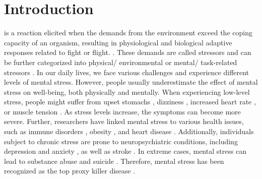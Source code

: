 \documentclass[journal]{IEEEtran}
\begin{document}
\section{Introduction}
 is a reaction elicited when the demands from the environment exceed the coping capacity of an organism, resulting in physiological and biological adaptive responses related to fight or flight. \cite{cohen1997stress_def}.
These demands are called stressors and can be further categorized into physical/ environmental or mental/ task-related stressors \cite{giannakakis2019stress_review_physiological_change}.
In our daily lives, we face various challenges and experience different levels of mental stress.
However, people usually underestimate the effect of mental stress on well-being, both physically and mentally.
When experiencing low-level stress, people might suffer from upset stomachs \cite{behere2011stress_upset_stomach}, dizziness \cite{andersson2000stess_dizzy}, increased heart rate \cite{delaney2000stress_hr}, or muscle tension \cite{lundberg1999stress_muscle}.
As stress levels increase, the symptoms can become more severe.
Further,  researchers have linked mental stress to various health issues, such as immune disorders \cite{segerstrom2004immune}, obesity \cite{jarali2013obesity}, and heart disease \cite{pickering2001mental_stress_heart_disease}.
Additionally, individuals subject to chronic stress are prone to neuropsychiatric conditions, including depression \cite{checkley1996stress_depression} and anxiety \cite{dieleman2015stress_anxiety}, as well as stroke \cite{kotlkega2016stress_stroke}.
 In extreme cases, mental stress can lead to substance abuse and suicide \cite{brent1995stress_substance_abuse}.
Therefore, mental stress has been recognized as the top proxy killer disease \cite{debnath2011proxy}.
\end{document}
